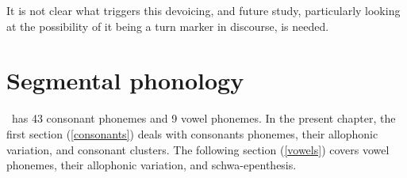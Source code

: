 It is not clear what triggers this devoicing, and future study, particularly looking at the possibility of it being a turn marker in discourse, is needed.



\chapter{Segmental phonology}\label{csANDvs}
\PS\ has 43 consonant phonemes and 9 vowel phonemes. In the present chapter, the first section (\ref{consonants}) deals with consonants phonemes, their allophonic variation, and consonant clusters. 
The following section (\ref{vowels}) covers vowel phonemes, their allophonic variation, and schwa-epenthesis. 




